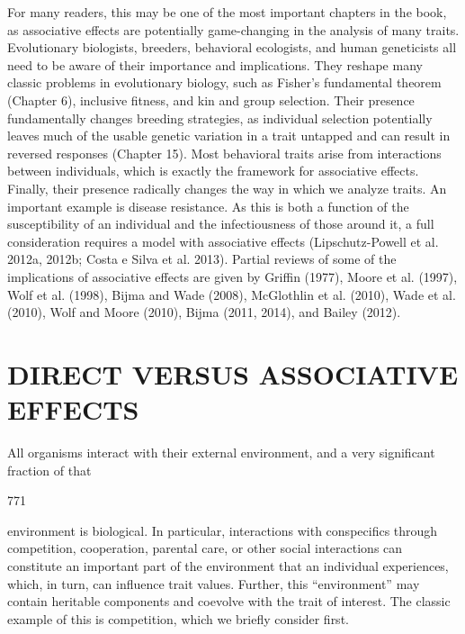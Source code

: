 \documentclass{article}
\begin{document}
For many readers, this may be one of the most important chapters in the book, as associative effects are potentially game-changing in the analysis of many traits. Evolutionary biologists, breeders, behavioral ecologists, and human geneticists all need to be aware of their importance and implications. They reshape many classic problems in evolutionary biology, such as Fisher's fundamental theorem (Chapter 6), inclusive fitness, and kin and group selection. Their presence fundamentally changes breeding strategies, as individual selection potentially leaves much of the usable genetic variation in a trait untapped and can result in reversed responses (Chapter 15). Most behavioral traits arise from interactions between individuals, which is exactly the framework for associative effects. Finally, their presence radically changes the way in which we analyze traits. An important example is disease resistance. As this is both a function of the susceptibility of an individual and the infectiousness of those around it, a full consideration requires a model with associative effects (Lipschutz-Powell et al. 2012a, 2012b; Costa e Silva et al. 2013). Partial reviews of some of the implications of associative effects are given by Griffin (1977), Moore et al. (1997), Wolf et al. (1998), Bijma and Wade (2008), McGlothlin et al. (2010), Wade et al. (2010), Wolf and Moore (2010), Bijma (2011, 2014), and Bailey (2012).

\section{DIRECT VERSUS ASSOCIATIVE EFFECTS}
All organisms interact with their external environment, and a very significant fraction of that

771

environment is biological. In particular, interactions with conspecifics through competition, cooperation, parental care, or other social interactions can constitute an important part of the environment that an individual experiences, which, in turn, can influence trait values. Further, this “environment” may contain heritable components and coevolve with the trait of interest. The classic example of this is competition, which we briefly consider first.
\end{document}
